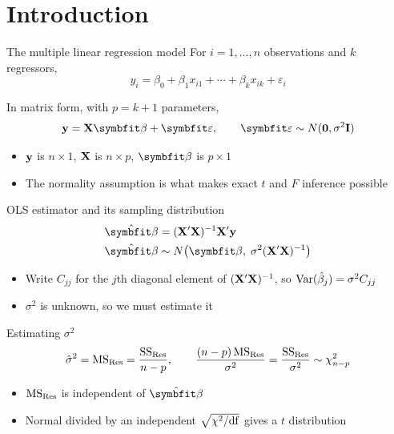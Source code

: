 \section{Introduction}


\begin{frame}{The multiple linear regression model}
    For $i=1,\dots,n$ observations and $k$ regressors,
    \[
        y_i = \beta_0 + \beta_1 x_{i1} + \cdots + \beta_k x_{ik} + \varepsilon_i
    \]

    In matrix form, with $p = k+1$ parameters,
    \[
        \by = \bX\bbeta + \bvarepsilon, \qquad \bvarepsilon \sim N(\bzero, \sigma^2 \bI)
    \]

    \begin{itemize}
        \item $\mathbf{y}$ is $n\times 1$, $\mathbf{X}$ is $n\times p$, $\bbeta$ is $p\times 1$
        \item The normality assumption is what makes exact $t$ and $F$ inference possible
    \end{itemize}
\end{frame}


\begin{frame}{OLS estimator and its sampling distribution}
    \begin{align*}
        \hat{\bbeta} &= (\bX'\bX)^{-1}\bX'\by \\
        \hat{\bbeta} &\sim N\!\left(\bbeta,\; \sigma^2(\bX'\bX)^{-1}\right)
    \end{align*}
    \begin{itemize}
        \item Write $C_{jj}$ for the $j$th diagonal element of $(\mathbf{X}'\mathbf{X})^{-1}$, so $\operatorname{Var}(\hat\beta_j) = \sigma^2 C_{jj}$
        \item $\sigma^2$ is unknown, so we must estimate it
    \end{itemize}
\end{frame}


\begin{frame}{Estimating $\sigma^2$}
    \begin{align*}
        \hat\sigma^2 = \mathrm{MS}_{\mathrm{Res}} = \frac{\mathrm{SS}_{\mathrm{Res}}}{n-p}, \qquad \frac{(n-p)\,\mathrm{MS}_{\mathrm{Res}}}{\sigma^2} = \frac{\mathrm{SS}_{\mathrm{Res}}}{\sigma^2} \sim \chi^2_{n-p}
    \end{align*}
    \begin{itemize}
        \item $\mathrm{MS}_{\mathrm{Res}}$ is independent of $\hat{\bbeta}$
        \item Normal divided by an independent $\sqrt{\chi^2/\mathrm{df}}$ gives a $t$ distribution
    \end{itemize}
\end{frame}


